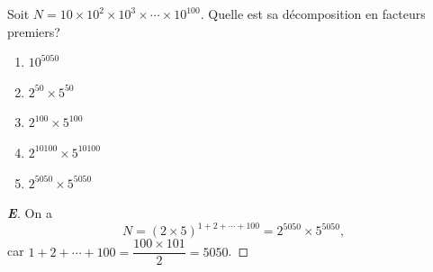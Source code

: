 % 
%
Soit $N = 10 \times 10^2 \times 10^3 \times \cdots \times 10^{100}$.
Quelle est sa décomposition en facteurs premiers?
\begin{enumerate}
  \item $10^{5050}$
  \item $2^{50} \times 5^{50}$
  \item $2^{100} \times 5^{100}$
  \item $2^{10100} \times 5^{10100}$
  \item $2^{5050} \times 5^{5050}$
\end{enumerate}
%
%
\begin{proof}[\textbf{E}]
On a
\begin{equation}
  N = (2 \times 5)^{1+2+\cdots+100} = 2^{5050} \times 5^{5050},
\end{equation}
car $1 + 2 + \cdots + 100 = \dfrac{100 \times 101}{2} = 5050$.
\end{proof}